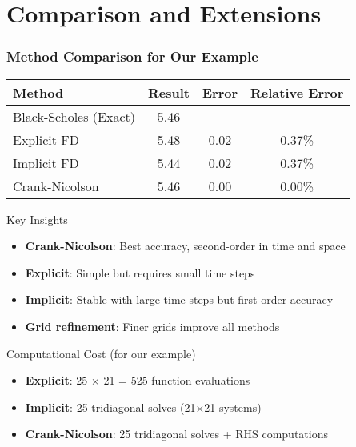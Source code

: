 \documentclass[aspectratio=169]{beamer}
\begin{document}
\section{Comparison and Extensions}

\begin{frame}
\frametitle{Method Comparison for Our Example}
\begin{center}
\begin{tabular}{lccc}
\toprule
\textbf{Method} & \textbf{Result} & \textbf{Error} & \textbf{Relative Error} \\
\midrule
Black-Scholes (Exact) & 5.46 & --- & --- \\
Explicit FD & 5.48 & 0.02 & 0.37\% \\
Implicit FD & 5.44 & 0.02 & 0.37\% \\
Crank-Nicolson & 5.46 & 0.00 & 0.00\% \\
\bottomrule
\end{tabular}
\end{center}

\begin{block}{Key Insights}
\begin{itemize}
\item \textbf{Crank-Nicolson}: Best accuracy, second-order in time and space
\item \textbf{Explicit}: Simple but requires small time steps
\item \textbf{Implicit}: Stable with large time steps but first-order accuracy
\item \textbf{Grid refinement}: Finer grids improve all methods
\end{itemize}
\end{block}

\begin{block}{Computational Cost (for our example)}
\begin{itemize}
\item \textbf{Explicit}: 25 × 21 = 525 function evaluations
\item \textbf{Implicit}: 25 tridiagonal solves (21×21 systems)
\item \textbf{Crank-Nicolson}: 25 tridiagonal solves + RHS computations
\end{itemize}
\end{block}
\end{frame}
\end{document}
